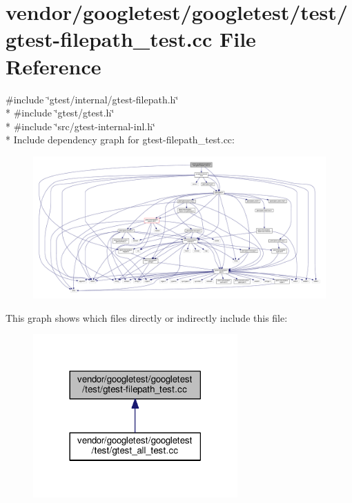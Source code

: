 \hypertarget{gtest-filepath__test_8cc}{}\section{vendor/googletest/googletest/test/gtest-\/filepath\+\_\+test.cc File Reference}
\label{gtest-filepath__test_8cc}
{\ttfamily \#include \char`\"{}gtest/internal/gtest-\/filepath.\+h\char`\"{}}\\*
{\ttfamily \#include \char`\"{}gtest/gtest.\+h\char`\"{}}\\*
{\ttfamily \#include \char`\"{}src/gtest-\/internal-\/inl.\+h\char`\"{}}\\*
Include dependency graph for gtest-\/filepath\+\_\+test.cc\+:\nopagebreak
\begin{figure}[H]
\begin{center}
\leavevmode
\includegraphics[width=350pt]{gtest-filepath__test_8cc__incl}
\end{center}
\end{figure}
This graph shows which files directly or indirectly include this file\+:\nopagebreak
\begin{figure}[H]
\begin{center}
\leavevmode
\includegraphics[width=222pt]{gtest-filepath__test_8cc__dep__incl}
\end{center}
\end{figure}
